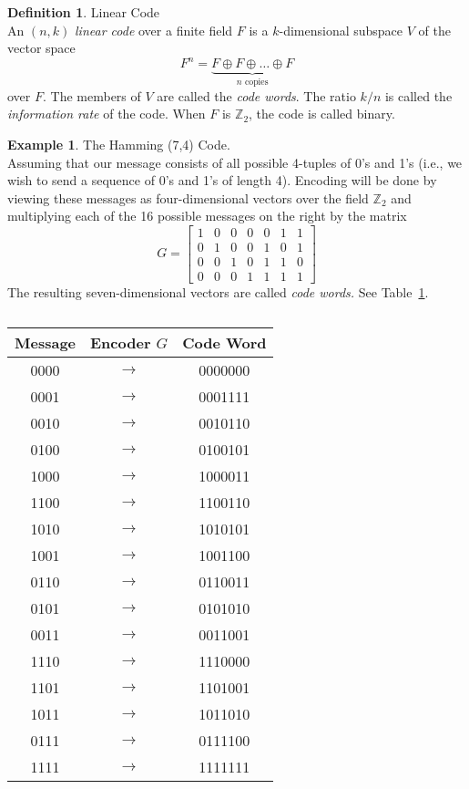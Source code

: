 \documentclass{article}
\newcommand{\Z}{\mathbb{Z}}
\theoremstyle{definition}
\newtheorem{definition}{Definition}
\newtheorem{example}{Example}
\begin{document}
\begin{definition}{Linear Code}\\An $(n,k)$ \textit{linear code} over a finite field $F$ is a $k$-dimensional subspace $V$ of the vector space \[F^n = \underbrace{F\oplus F\oplus \dots \oplus F}_{\text{$n$ copies}}\]
over $F$. The members of $V$ are called the \textit{code words}. The ratio $k/n$ is called the \textit{information rate} of the code. When $F$ is $\Z_2$, the code is called binary.
\end{definition}

\begin{example}{The Hamming (7,4) Code.}\\
Assuming that our message consists of all possible 4-tuples of 0's and 1's (i.e., we wish to send a sequence of 0's and 1's of length 4). Encoding will be done by viewing these messages as four-dimensional vectors over the field $\Z_2$ and multiplying each of the 16 possible messages on the right by the matrix
\[G=\begin{bmatrix}
1&0&0&0&0&1&1\\
0&1&0&0&1&0&1\\
0&0&1&0&1&1&0\\
0&0&0&1&1&1&1
\end{bmatrix}\]
The resulting seven-dimensional vectors are called \textit{code words.} See Table~\ref{tab:hamming(7,4)}.
\begin{table}[ht!]
    \centering
    \begin{tabular}{c c c}
        \hline
        Message & Encoder $G$ & Code Word\\
        \hline
        0000 & $\rightarrow$ & 0000000 \\
        0001 & $\rightarrow$ & 0001111 \\
        0010 & $\rightarrow$ & 0010110 \\
        0100 & $\rightarrow$ & 0100101 \\
        1000 & $\rightarrow$ & 1000011 \\
        1100 & $\rightarrow$ & 1100110 \\
        1010 & $\rightarrow$ & 1010101 \\
        1001 & $\rightarrow$ & 1001100 \\
        0110 & $\rightarrow$ & 0110011 \\
        0101 & $\rightarrow$ & 0101010 \\
        0011 & $\rightarrow$ & 0011001 \\
        1110 & $\rightarrow$ & 1110000 \\
        1101 & $\rightarrow$ & 1101001 \\
        1011 & $\rightarrow$ & 1011010 \\
        0111 & $\rightarrow$ & 0111100 \\
        1111 & $\rightarrow$ & 1111111 \\
    \end{tabular}
    \caption{}
    \label{tab:hamming(7,4)}
\end{table}
\end{example}
\end{document}
